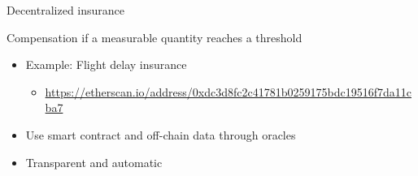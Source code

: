 \documentclass{beamer}
\begin{document}
\begin{frame}{Decentralized insurance}
\begin{tcolorbox}[enhanced,drop shadow, title=Parametric insurance]
    Compensation if a measurable quantity reaches a threshold 
\end{tcolorbox}
\begin{itemize}
  \item Example: Flight delay insurance
  \begin{itemize}
    \item \url{https://etherscan.io/address/0xdc3d8fc2c41781b0259175bdc19516f7da11cba7}
  \end{itemize}
  \item Use smart contract and off-chain data through oracles
  \item Transparent and automatic
\end{itemize}
\end{frame}
\end{document}
